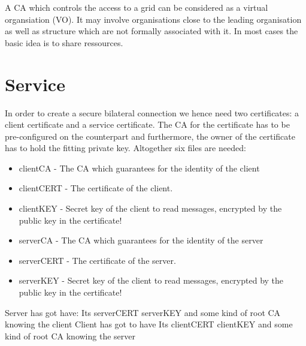 A CA which controls the access to a grid can be considered as a virtual organsiation (VO). It may involve organisations close to the leading organisation as well as structure which are not formally associated with it. In most cases the basic idea is to share ressources.



\clearpage
\section{Service}

In order to create a secure bilateral connection we hence need two certificates: a client certificate and a service certificate.
The CA for the certificate has to be pre-configured on the counterpart and furthermore, the owner of the certificate has to hold the fitting private key. Altogether six files are needed:
\begin{itemize}
 \item clientCA   - The CA which guarantees for the identity of the client
 \item clientCERT - The certificate of the client.
 \item clientKEY  - Secret key of the client to read messages, encrypted by the public key in the certificate!

 \item serverCA   - The CA which guarantees for the identity of the server
 \item serverCERT - The certificate of the server.
 \item serverKEY  - Secret key of the client to read messages, encrypted by the public key in the certificate!
\end{itemize}

Server has got have:
Its  serverCERT serverKEY and some kind of root CA knowing the client
Client has got to have
Its  clientCERT clientKEY and some kind of root CA knowing the server









%
%




